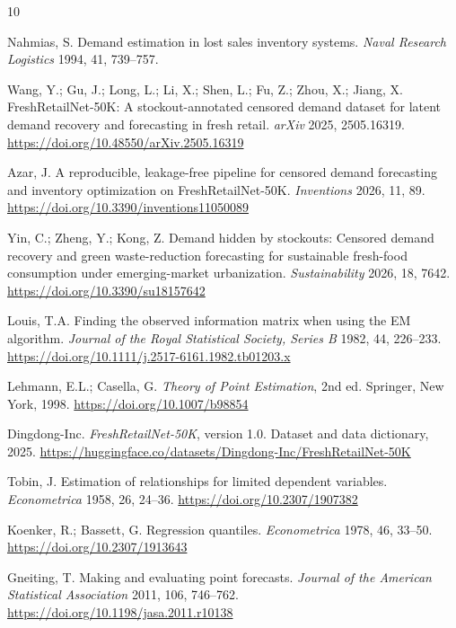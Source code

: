 \documentclass[11pt,a4paper]{article}
\begin{document}
\begin{thebibliography}{10}\small\setlength{\itemsep}{2pt}\setlength{\parskip}{0pt}

 Nahmias, S. Demand estimation in lost sales inventory systems. \emph{Naval Research Logistics} 1994, 41, 739--757.

 Wang, Y.; Gu, J.; Long, L.; Li, X.; Shen, L.; Fu, Z.; Zhou, X.; Jiang, X. FreshRetailNet-50K: A stockout-annotated censored demand dataset for latent demand recovery and forecasting in fresh retail. \emph{arXiv} 2025, 2505.16319. \url{https://doi.org/10.48550/arXiv.2505.16319}

 Azar, J. A reproducible, leakage-free pipeline for censored demand forecasting and inventory optimization on FreshRetailNet-50K. \emph{Inventions} 2026, 11, 89. \url{https://doi.org/10.3390/inventions11050089}

 Yin, C.; Zheng, Y.; Kong, Z. Demand hidden by stockouts: Censored demand recovery and green waste-reduction forecasting for sustainable fresh-food consumption under emerging-market urbanization. \emph{Sustainability} 2026, 18, 7642. \url{https://doi.org/10.3390/su18157642}

 Louis, T.A. Finding the observed information matrix when using the EM algorithm. \emph{Journal of the Royal Statistical Society, Series B} 1982, 44, 226--233. \url{https://doi.org/10.1111/j.2517-6161.1982.tb01203.x}

 Lehmann, E.L.; Casella, G. \emph{Theory of Point Estimation}, 2nd ed. Springer, New York, 1998. \url{https://doi.org/10.1007/b98854}

 Dingdong-Inc. \emph{FreshRetailNet-50K}, version 1.0. Dataset and data dictionary, 2025. \url{https://huggingface.co/datasets/Dingdong-Inc/FreshRetailNet-50K}

 Tobin, J. Estimation of relationships for limited dependent variables. \emph{Econometrica} 1958, 26, 24--36. \url{https://doi.org/10.2307/1907382}

 Koenker, R.; Bassett, G. Regression quantiles. \emph{Econometrica} 1978, 46, 33--50. \url{https://doi.org/10.2307/1913643}

 Gneiting, T. Making and evaluating point forecasts. \emph{Journal of the American Statistical Association} 2011, 106, 746--762. \url{https://doi.org/10.1198/jasa.2011.r10138}

\end{thebibliography}
\end{document}
